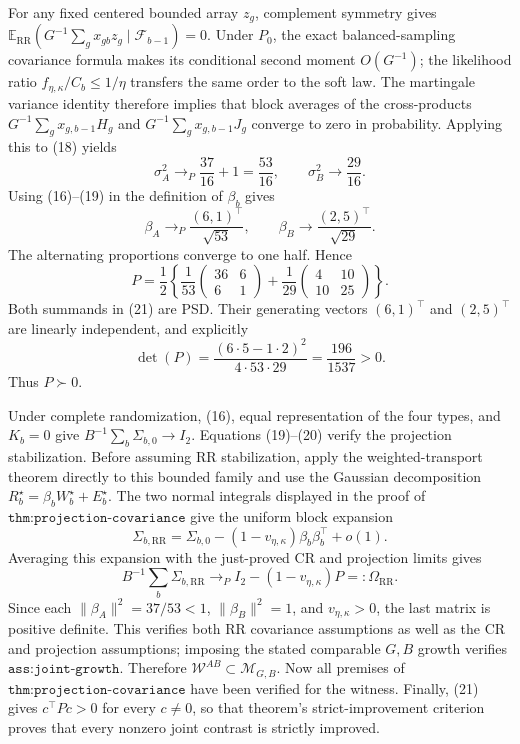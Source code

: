 For any fixed centered bounded array \(z_g\), complement symmetry gives
\(\mathbb E_{\mathrm{RR}}(G^{-1}\sum_gx_{gb}z_g\mid\mathcal F_{b-1})=0\).  Under \(P_0\), the exact balanced-sampling covariance formula makes its conditional second moment \(O(G^{-1})\); the likelihood ratio \(f_{\eta,\kappa}/C_b\leq1/\eta\) transfers the same order to the soft law.  The martingale variance identity therefore implies that block averages of the cross-products \(G^{-1}\sum_gx_{g,b-1}H_g\) and \(G^{-1}\sum_gx_{g,b-1}J_g\) converge to zero in probability.  Applying this to (18) yields
\[
 \sigma_A^2\longrightarrow_P\frac{37}{16}+1=\frac{53}{16},
 \qquad \sigma_B^2\longrightarrow\frac{29}{16}.              \tag{19}
\]
Using (16)--(19) in the definition of \(\beta_b\) gives
\[
 \beta_A\longrightarrow_P\frac{(6,1)^\top}{\sqrt{53}},
 \qquad
 \beta_B\longrightarrow\frac{(2,5)^\top}{\sqrt{29}}.        \tag{20}
\]
The alternating proportions converge to one half.  Hence
\[
 P=\frac12\left\{
 \frac1{53}\begin{pmatrix}36&6\\6&1\end{pmatrix}
 +\frac1{29}\begin{pmatrix}4&10\\10&25\end{pmatrix}
 \right\}.                                                    \tag{21}
\]
Both summands in (21) are PSD.  Their generating vectors \((6,1)^\top\) and \((2,5)^\top\) are linearly independent, and explicitly
\[
 \det(P)=\frac{(6\cdot5-1\cdot2)^2}{4\cdot53\cdot29}
 =\frac{196}{1537}>0.
\]
Thus \(P\succ0\).

Under complete randomization, (16), equal representation of the four types, and \(K_b=0\) give \(B^{-1}\sum_b\Sigma_{b,0}\to I_2\).  Equations (19)--(20) verify the projection stabilization.  Before assuming RR stabilization, apply the weighted-transport theorem directly to this bounded family and use the Gaussian decomposition \(R_b^\star=\beta_bW_b^\star+E_b^\star\).  The two normal integrals displayed in the proof of \(\texttt{thm:projection-covariance}\) give the uniform block expansion
\[
 \Sigma_{b,\mathrm{RR}}
 =\Sigma_{b,0}-(1-v_{\eta,\kappa})\beta_b\beta_b^\top+o(1).
\]
Averaging this expansion with the just-proved CR and projection limits gives
\[
 B^{-1}\sum_b\Sigma_{b,\mathrm{RR}}
 \longrightarrow_P I_2-(1-v_{\eta,\kappa})P=:\Omega_{\mathrm{RR}}.
\]
Since each \(\|\beta_A\|^2=37/53<1\), \(\|\beta_B\|^2=1\), and \(v_{\eta,\kappa}>0\), the last matrix is positive definite.  This verifies both RR covariance assumptions as well as the CR and projection assumptions; imposing the stated comparable \(G,B\) growth verifies \(\texttt{ass:joint-growth}\).  Therefore \(\mathcal W^{AB}\subset\mathcal M_{G,B}\).  Now all premises of \(\texttt{thm:projection-covariance}\) have been verified for the witness.  Finally, (21) gives \(c^\top Pc>0\) for every \(c\neq0\), so that theorem's strict-improvement criterion proves that every nonzero joint contrast is strictly improved.